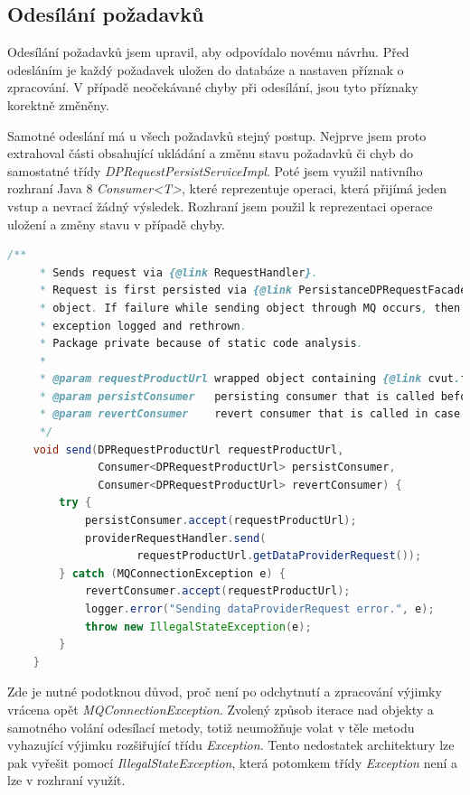 \documentclass[thesis=B,czech]{FITthesis}[2012/06/26]
\begin{document}
\subsection{Odesílání požadavků}
Odesílání požadavků jsem upravil, aby odpovídalo novému návrhu. Před odesláním je každý požadavek uložen do databáze a nastaven
příznak o zpracování. V případě neočekávané chyby při odesílání, jsou tyto příznaky korektně změněny.
\par
Samotné odeslání má u všech požadavků stejný postup. Nejprve jsem proto extrahoval části obsahující ukládání a změnu stavu požadavků či chyb do samostatné třídy
\textit{DPRequestPersistServiceImpl}. Poté jsem využil nativního rozhraní Java 8 \textit{Consumer<T>}, které reprezentuje
operaci, která přijímá jeden vstup a nevrací žádný výsledek. Rozhraní jsem použil k reprezentaci operace uložení a
změny stavu v případě chyby.
\par
\begin{lstlisting}[language=Java, caption={Společná metoda zajišťující odeslání DataProvider požadavků}]
    /**
     * Sends request via {@link RequestHandler}.
     * Request is first persisted via {@link PersistanceDPRequestFacade} and it's id is set to the request in wrapper
     * object. If failure while sending object through MQ occurs, then {@link Consumer} failureHandler is called,
     * exception logged and rethrown.
     * Package private because of static code analysis.
     *
     * @param requestProductUrl wrapped object containing {@link cvut.fit.persistence.entity.ProductUrl}, {@link DataProviderRequest}
     * @param persistConsumer   persisting consumer that is called before sending
     * @param revertConsumer    revert consumer that is called in case of sending failure
     */
    void send(DPRequestProductUrl requestProductUrl,
              Consumer<DPRequestProductUrl> persistConsumer,
              Consumer<DPRequestProductUrl> revertConsumer) {
        try {
            persistConsumer.accept(requestProductUrl);
            providerRequestHandler.send(
                    requestProductUrl.getDataProviderRequest());
        } catch (MQConnectionException e) {
            revertConsumer.accept(requestProductUrl);
            logger.error("Sending dataProviderRequest error.", e);
            throw new IllegalStateException(e);
        }
    }
\end{lstlisting}

Zde je nutné podotknou důvod, proč není po odchytnutí a zpracování výjimky vrácena opět \textit{MQConnectionException}. 
Zvolený způsob iterace nad objekty a samotného volání odesílací metody, totiž neumožňuje volat v těle metodu
vyhazující výjimku rozšiřující třídu \textit{Exception}.
Tento nedostatek architektury lze pak vyřešit pomocí \textit{IllegalStateException}, která potomkem třídy \textit{Exception} není a lze
v rozhraní využít.
\par
\end{document}
